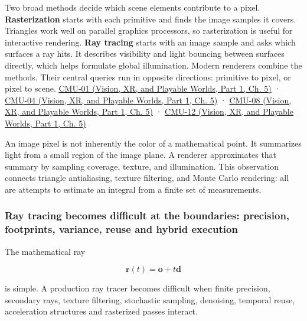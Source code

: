Two broad methods decide which scene elements contribute to a pixel. \textbf{Rasterization} starts with each primitive and finds the image samples it covers. Triangles work well on parallel graphics processors, so rasterization is useful for interactive rendering. \textbf{Ray tracing} starts with an image sample and asks which surfaces a ray hits. It describes visibility and light bouncing between surfaces directly, which helps formulate global illumination. Modern renderers combine the methods. Their central queries run in opposite directions: primitive to pixel, or pixel to scene. \href{../07-Vision-XR-and-Playable-Worlds-P01/main.pdf\#04-visual-computing-ii-ch036-cmu-01---course-overview}{CMU-01 (Vision, XR, and Playable Worlds, Part 1, Ch. 5)} · \href{../07-Vision-XR-and-Playable-Worlds-P01/main.pdf\#04-visual-computing-ii-ch036-cmu-04---drawing-a-triangle-and-an-intro-to-sampling}{CMU-04 (Vision, XR, and Playable Worlds, Part 1, Ch. 5)} · \href{../07-Vision-XR-and-Playable-Worlds-P01/main.pdf\#04-visual-computing-ii-ch036-cmu-08---depth-and-transparency}{CMU-08 (Vision, XR, and Playable Worlds, Part 1, Ch. 5)} · \href{../07-Vision-XR-and-Playable-Worlds-P01/main.pdf\#04-visual-computing-ii-ch036-cmu-12---geometric-queries}{CMU-12 (Vision, XR, and Playable Worlds, Part 1, Ch. 5)}

An image pixel is not inherently the color of a mathematical point. It summarizes light from a small region of the image plane. A renderer approximates that summary by sampling coverage, texture, and illumination. This observation connects triangle antialiasing, texture filtering, and Monte Carlo rendering: all are attempts to estimate an integral from a finite set of measurements.

\subsubsection{Ray tracing becomes difficult at the boundaries: precision, footprints, variance, reuse and hybrid execution}\label{03-visual-computing-i-ch001-ray-tracing-becomes-difficult-at-the-boundaries-precision-footprints-variance-reuse-and-hybrid-execution}

\hypertarget{03-visual-computing-i-ch001-ray-tracing-becomes-difficult-at-the-boundaries-precision-footprints-variance-reuse-and-hybrid-execution}{}

The mathematical ray

\[
\mathbf r(t)=\mathbf o+t\mathbf d
\]

is simple. A production ray tracer becomes difficult when finite precision, secondary rays, texture filtering, stochastic sampling, denoising, temporal reuse, acceleration structures and rasterized passes interact.

